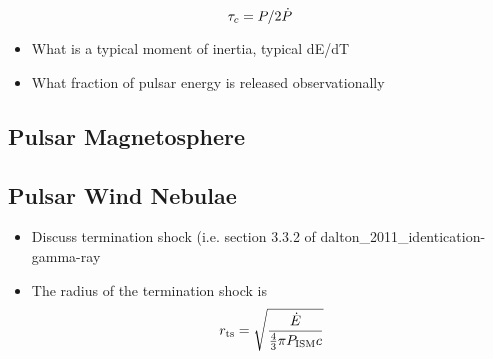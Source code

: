 \begin{equation}
  \tau_c = P/2\dot{P}
\end{equation}


\begin{itemize}
  \item What is a typical moment of inertia, typical dE/dT
  \item What fraction of pulsar energy is released observationally
\end{itemize}

\subsection{Pulsar Magnetosphere}

\subsection{Pulsar Wind Nebulae}

\begin{itemize}
  \item Discuss termination shock (i.e. section 3.3.2 of dalton\_2011\_identication-gamma-ray
  \item The radius of the termination shock is
    \begin{equation}
      r_\text{ts} = \sqrt{\frac{\dot{E}}{\tfrac{4}{3}\pi P_\text{ISM} c}}
    \end{equation}

\end{itemize}



